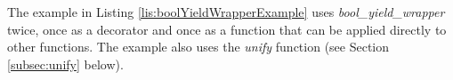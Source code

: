 \begin{itemize}


\smallv
The example in Listing \ref{lis:boolYieldWrapperExample} uses \textit{bool\_yield\_wrapper} twice, once as a decorator and once as a function that can be applied directly to other functions. The example also uses the \textit{unify} function (see Section \ref{subsec:unify} below). 







\end{itemize}
